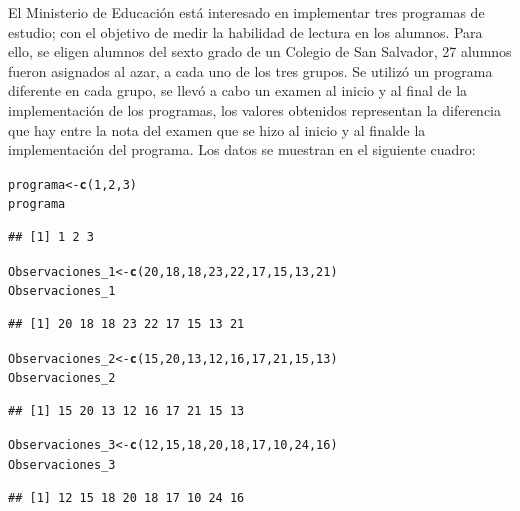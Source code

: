 \documentclass[12pt,letterpaper]{article}\usepackage[]{graphicx}\usepackage[]{color}
\makeatletter
\newcommand{\hlnum}[1]{\textcolor[rgb]{0.686,0.059,0.569}{#1}}%
\newcommand{\hlstd}[1]{\textcolor[rgb]{0.345,0.345,0.345}{#1}}%
\newcommand{\hlkwb}[1]{\textcolor[rgb]{0.69,0.353,0.396}{#1}}%
\newcommand{\hlkwd}[1]{\textcolor[rgb]{0.737,0.353,0.396}{\textbf{#1}}}%
\newenvironment{kframe}{%
 \def\at@end@of@kframe{}%
 \ifinner\ifhmode%
  \def\at@end@of@kframe{\end{minipage}}%
  \begin{minipage}{\columnwidth}%
 \fi\fi%
 \def\FrameCommand##1{\hskip\@totalleftmargin \hskip-\fboxsep
 \colorbox{shadecolor}{##1}\hskip-\fboxsep
     \hskip-\linewidth \hskip-\@totalleftmargin \hskip\columnwidth}%
 \MakeFramed {\advance\hsize-\width
   \@totalleftmargin\z@ \linewidth\hsize
   \@setminipage}}%
 {\par\unskip\endMakeFramed%
 \at@end@of@kframe}
\newenvironment{knitrout}{}{} %
\makeatother
\begin{document}
El Ministerio de Educaci\'on est\'a interesado en implementar tres programas de estudio; con el objetivo de medir la habilidad de lectura en los alumnos. Para ello, se eligen alumnos del sexto grado de un Colegio de San Salvador, 27 alumnos fueron asignados al azar, a cada uno de los tres grupos. Se utiliz\'o un programa diferente en cada grupo, se llev\'o a cabo un examen al inicio y al final de la implementaci\'on de los programas, los valores obtenidos representan la diferencia que hay entre la nota del examen que se hizo al inicio y al finalde la implementaci\'on del programa. Los datos se muestran en el siguiente cuadro:
\begin{knitrout}
\color{fgcolor}\begin{kframe}
\begin{alltt}
\hlstd{programa} \hlkwb{<-} \hlkwd{c}\hlstd{(}\hlnum{1}\hlstd{,} \hlnum{2}\hlstd{,} \hlnum{3}\hlstd{)}
\hlstd{programa}
\end{alltt}
\begin{verbatim}
## [1] 1 2 3
\end{verbatim}
\begin{alltt}
\hlstd{Observaciones_1} \hlkwb{<-} \hlkwd{c}\hlstd{(}\hlnum{20}\hlstd{,} \hlnum{18}\hlstd{,} \hlnum{18}\hlstd{,} \hlnum{23}\hlstd{,} \hlnum{22}\hlstd{,} \hlnum{17}\hlstd{,} \hlnum{15}\hlstd{,} \hlnum{13}\hlstd{,} \hlnum{21}\hlstd{)}
\hlstd{Observaciones_1}
\end{alltt}
\begin{verbatim}
## [1] 20 18 18 23 22 17 15 13 21
\end{verbatim}
\begin{alltt}
\hlstd{Observaciones_2} \hlkwb{<-} \hlkwd{c}\hlstd{(}\hlnum{15}\hlstd{,} \hlnum{20}\hlstd{,} \hlnum{13}\hlstd{,} \hlnum{12}\hlstd{,} \hlnum{16}\hlstd{,} \hlnum{17}\hlstd{,} \hlnum{21}\hlstd{,} \hlnum{15}\hlstd{,} \hlnum{13}\hlstd{)}
\hlstd{Observaciones_2}
\end{alltt}
\begin{verbatim}
## [1] 15 20 13 12 16 17 21 15 13
\end{verbatim}
\begin{alltt}
\hlstd{Observaciones_3} \hlkwb{<-} \hlkwd{c}\hlstd{(}\hlnum{12}\hlstd{,} \hlnum{15}\hlstd{,} \hlnum{18}\hlstd{,} \hlnum{20}\hlstd{,} \hlnum{18}\hlstd{,} \hlnum{17}\hlstd{,} \hlnum{10}\hlstd{,} \hlnum{24}\hlstd{,} \hlnum{16}\hlstd{)}
\hlstd{Observaciones_3}
\end{alltt}
\begin{verbatim}
## [1] 12 15 18 20 18 17 10 24 16
\end{verbatim}
\end{kframe}
\end{knitrout}
\end{document}
